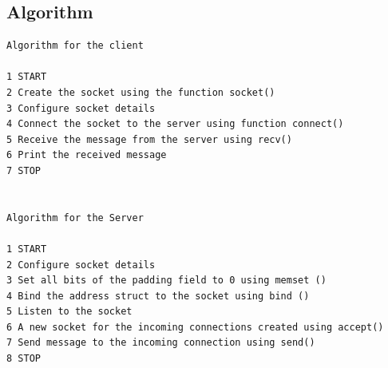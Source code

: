 \subsection{Algorithm}
\begin{verbatim}
Algorithm for the client

1 START
2 Create the socket using the function socket()
3 Configure socket details
4 Connect the socket to the server using function connect()
5 Receive the message from the server using recv()
6 Print the received message
7 STOP


Algorithm for the Server

1 START
2 Configure socket details
3 Set all bits of the padding field to 0 using memset ()
4 Bind the address struct to the socket using bind ()
5 Listen to the socket
6 A new socket for the incoming connections created using accept()
7 Send message to the incoming connection using send()
8 STOP
\end{verbatim}

